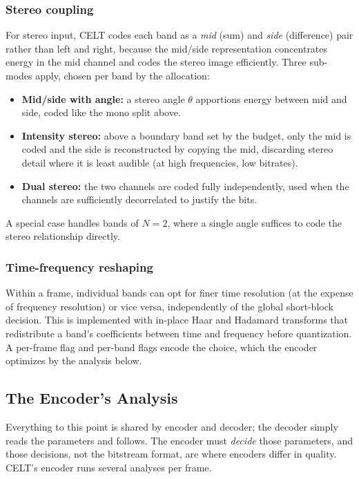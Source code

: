\subsubsection{Stereo coupling}

For stereo input, CELT codes each band as a \emph{mid} (sum) and \emph{side}
(difference) pair rather than left and right, because the mid/side
representation concentrates energy in the mid channel and codes the stereo image
efficiently. Three sub-modes apply, chosen per band by the allocation:
\begin{itemize}[itemsep=2pt]
  \item \textbf{Mid/side with angle:} a stereo angle $\theta$ apportions energy
    between mid and side, coded like the mono split above.
  \item \textbf{Intensity stereo:} above a boundary band set by the budget, only
    the mid is coded and the side is reconstructed by copying the
    mid, discarding
    stereo detail where it is least audible (at high frequencies, low bitrates).
  \item \textbf{Dual stereo:} the two channels are coded fully
    independently, used
    when the channels are sufficiently decorrelated to justify the bits.
\end{itemize}
A special case handles bands of $N=2$, where a single angle suffices to code the
stereo relationship directly.

\subsubsection{Time-frequency reshaping}

Within a frame, individual bands can opt for finer time resolution (at the
expense of frequency resolution) or vice versa, independently of the global
short-block decision. This is implemented with in-place Haar and Hadamard
transforms that redistribute a band's coefficients between time and frequency
before quantization. A per-frame  flag and per-band flags
encode the choice, which the encoder optimizes by the analysis below.

\subsection{The Encoder's Analysis}\label{subsec:celt_encoder}

Everything to this point is shared by encoder and decoder; the decoder simply
reads the parameters and follows. The encoder must \emph{decide} those
parameters, and those decisions, not the bitstream format, are where encoders
differ in quality. CELT's encoder runs several analyses per frame.

